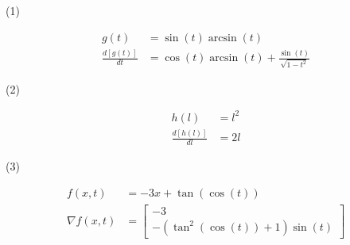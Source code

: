 \documentclass{article}
\begin{document}
(1)

\begin{align*}
	g{\left(t \right)} &= \sin{\left(t \right)} \operatorname{arcsin}{\left(t \right)}\\
	\frac{d \left[ g(t) \right ] }{dt} &= \cos{\left(t \right)} \operatorname{arcsin}{\left(t \right)} + \frac{\sin{\left(t \right)}}{\sqrt{1 - t^{2}}}
\end{align*}

(2)

\begin{align*}
	h{\left(l \right)} &= l^{2}\\
	\frac{d \left[ h(l) \right ] }{dl} &= 2 l
\end{align*}

(3)

\begin{align*}
	f{\left(x,t \right)} &= - 3 x + \tan{\left(\cos{\left(t \right)} \right)}\\
	\nabla f{\left(x,t \right)} &= \left[\begin{matrix}-3\\- \left(\tan^{2}{\left(\cos{\left(t \right)} \right)} + 1\right) \sin{\left(t \right)}\end{matrix}\right]
\end{align*}
\end{document}

